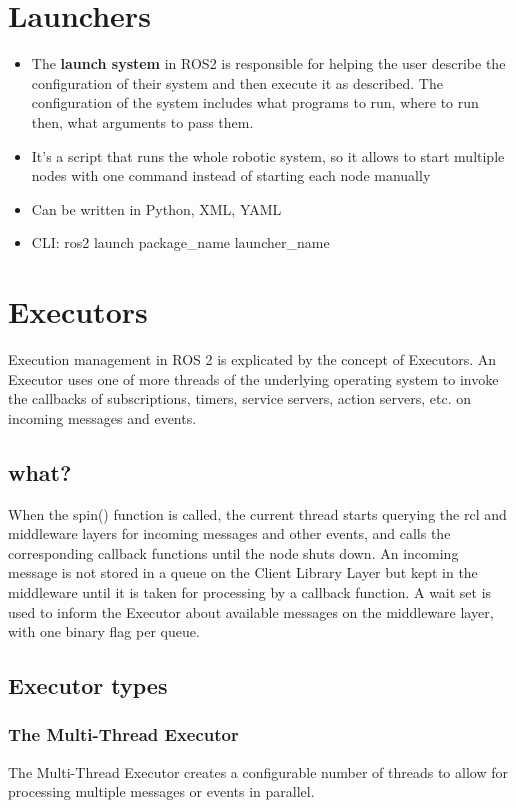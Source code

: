 \section{Launchers}
\begin{itemize}
    \item The \textbf{launch system} in ROS2 is responsible for helping the user describe the configuration of their system and then execute it as described. The configuration of the system includes what programs to run, where to run then, what arguments to pass them.
    \item It's a script that runs the whole robotic system, so it allows to start multiple nodes with one command instead of starting each node manually
    \item Can be written in Python, XML, YAML
    \item CLI: ros2 launch package\_name launcher\_name
\end{itemize}


\section{Executors}


Execution management in ROS 2 is explicated by the concept of Executors. An Executor uses one of more threads of the underlying operating system to invoke the callbacks of subscriptions, timers, service servers, action servers, etc. on incoming messages and events.
\subsection{what?}
When the spin() function is called, the current thread starts querying the rcl and middleware layers for incoming messages and other events, and calls the corresponding callback functions until the node shuts down.
An incoming message is not stored in a queue on the Client Library Layer but kept in the middleware until it is taken for processing by a callback function. 
A wait set is used to inform the Executor about available messages on the middleware layer, with one binary flag per queue.
\subsection{Executor types}

\subsubsection{The Multi-Thread Executor}
The Multi-Thread Executor creates a configurable number of threads to allow for processing multiple messages or events in parallel.

